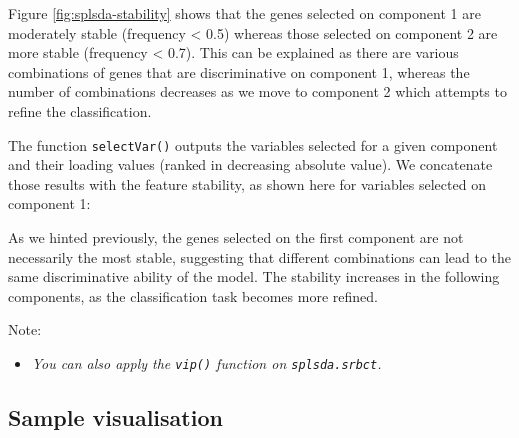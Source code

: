 \documentclass[
]{book}
\newenvironment{Shaded}{\begin{snugshade}}{\end{snugshade}}
\newcommand{\AttributeTok}[1]{\textcolor[rgb]{0.77,0.63,0.00}{#1}}
\newcommand{\CommentTok}[1]{\textcolor[rgb]{0.56,0.35,0.01}{\textit{#1}}}
\newcommand{\DecValTok}[1]{\textcolor[rgb]{0.00,0.00,0.81}{#1}}
\newcommand{\FunctionTok}[1]{\textcolor[rgb]{0.00,0.00,0.00}{#1}}
\newcommand{\NormalTok}[1]{#1}
\newcommand{\OtherTok}[1]{\textcolor[rgb]{0.56,0.35,0.01}{#1}}
\newcommand{\SpecialCharTok}[1]{\textcolor[rgb]{0.00,0.00,0.00}{#1}}
\providecommand{\tightlist}{%
  \setlength{\itemsep}{0pt}\setlength{\parskip}{0pt}}
\begin{document}
Figure \ref{fig:splsda-stability} shows that the genes selected on component 1 are moderately stable (frequency \textless{} 0.5) whereas those selected on component 2 are more stable (frequency \textless{} 0.7). This can be explained as there are various combinations of genes that are discriminative on component 1, whereas the number of combinations decreases as we move to component 2 which attempts to refine the classification.

The function \texttt{selectVar()} outputs the variables selected for a given component and their loading values (ranked in decreasing absolute value). We concatenate those results with the feature stability, as shown here for variables selected on component 1:

\begin{Shaded}
\end{Shaded}

As we hinted previously, the genes selected on the first component are not necessarily the most stable, suggesting that different combinations can lead to the same discriminative ability of the model. The stability increases in the following components, as the classification task becomes more refined.

Note:

\begin{itemize}
\tightlist
\item
  \emph{You can also apply the \texttt{vip()} function on \texttt{splsda.srbct}.}
\end{itemize}

\hypertarget{sample-visualisation}{%
\subsection{Sample visualisation}\label{sample-visualisation}}
\end{document}
